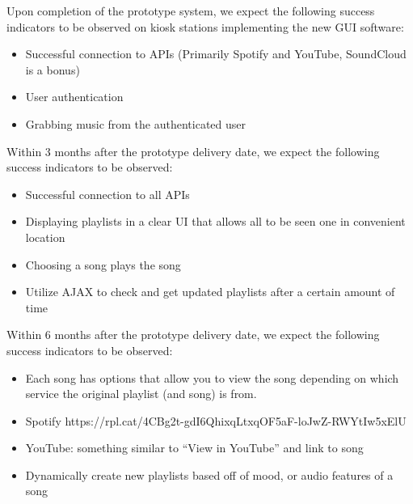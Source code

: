 Upon completion of the prototype system, we expect the following success indicators to be observed on kiosk stations implementing the new GUI software:
\begin{itemize}
  \item Successful connection to APIs (Primarily Spotify and YouTube, SoundCloud is a bonus)
  \item User authentication
  \item Grabbing music from the authenticated user
\end{itemize}

Within 3 months after the prototype delivery date, we expect the following success indicators to be observed:
\begin{itemize}
  \item Successful connection to all APIs
  \item Displaying playlists in a clear UI that allows all to be seen one in convenient location
  \item Choosing a song plays the song
  \item Utilize AJAX to check and get updated playlists after a certain amount of time
\end{itemize}

Within 6 months after the prototype delivery date, we expect the following success indicators to be observed:
\begin{itemize}
  \item Each song has options that allow you to view the song depending on which service the original playlist (and song) is from.
    \item Spotify https://rpl.cat/4CBg2t-gdI6QhixqLtxqOF5aF-loJwZ-RWYtIw5xElU
    \item YouTube: something similar to “View in YouTube” and link to song
  \item Dynamically create new playlists based off of mood, or audio features of a song
\end{itemize}
